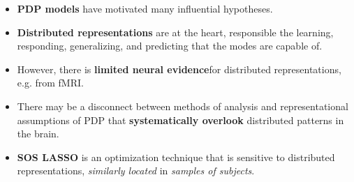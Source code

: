 \begin{itemize}\compresslist

\item {\bf PDP models} have motivated many influential hypotheses. 

\item {\bf Distributed representations} are at the heart, responsible the learning, responding, generalizing, and predicting that the modes are capable of.

\item However, there is {\bf limited neural evidence}for distributed representations, e.g. from fMRI.

\item There may be a disconnect between methods of analysis and representational assumptions of PDP that {\bf systematically overlook} distributed patterns in the brain. 

\item {\bf SOS LASSO} is an optimization technique that is sensitive to distributed representations, {\em similarly located} in {\em samples of subjects}. 

\end{itemize}